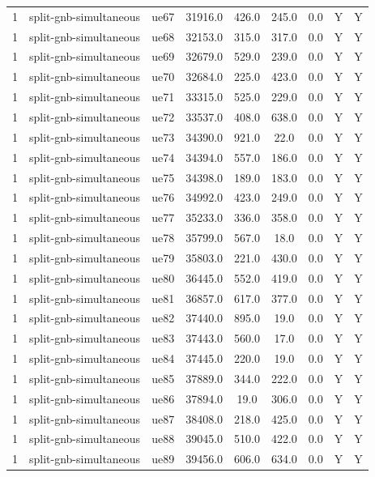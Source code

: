 \begin{table}[ht]
\begin{tabular}{|c|c|c|c|c|c|c|c|c|}
1 & split-gnb-simultaneous & ue67 & 31916.0 & 426.0 & 245.0 & 0.0 & Y & Y \\
1 & split-gnb-simultaneous & ue68 & 32153.0 & 315.0 & 317.0 & 0.0 & Y & Y \\
1 & split-gnb-simultaneous & ue69 & 32679.0 & 529.0 & 239.0 & 0.0 & Y & Y \\
1 & split-gnb-simultaneous & ue70 & 32684.0 & 225.0 & 423.0 & 0.0 & Y & Y \\
1 & split-gnb-simultaneous & ue71 & 33315.0 & 525.0 & 229.0 & 0.0 & Y & Y \\
1 & split-gnb-simultaneous & ue72 & 33537.0 & 408.0 & 638.0 & 0.0 & Y & Y \\
1 & split-gnb-simultaneous & ue73 & 34390.0 & 921.0 & 22.0 & 0.0 & Y & Y \\
1 & split-gnb-simultaneous & ue74 & 34394.0 & 557.0 & 186.0 & 0.0 & Y & Y \\
1 & split-gnb-simultaneous & ue75 & 34398.0 & 189.0 & 183.0 & 0.0 & Y & Y \\
1 & split-gnb-simultaneous & ue76 & 34992.0 & 423.0 & 249.0 & 0.0 & Y & Y \\
1 & split-gnb-simultaneous & ue77 & 35233.0 & 336.0 & 358.0 & 0.0 & Y & Y \\
1 & split-gnb-simultaneous & ue78 & 35799.0 & 567.0 & 18.0 & 0.0 & Y & Y \\
1 & split-gnb-simultaneous & ue79 & 35803.0 & 221.0 & 430.0 & 0.0 & Y & Y \\
1 & split-gnb-simultaneous & ue80 & 36445.0 & 552.0 & 419.0 & 0.0 & Y & Y \\
1 & split-gnb-simultaneous & ue81 & 36857.0 & 617.0 & 377.0 & 0.0 & Y & Y \\
1 & split-gnb-simultaneous & ue82 & 37440.0 & 895.0 & 19.0 & 0.0 & Y & Y \\
1 & split-gnb-simultaneous & ue83 & 37443.0 & 560.0 & 17.0 & 0.0 & Y & Y \\
1 & split-gnb-simultaneous & ue84 & 37445.0 & 220.0 & 19.0 & 0.0 & Y & Y \\
1 & split-gnb-simultaneous & ue85 & 37889.0 & 344.0 & 222.0 & 0.0 & Y & Y \\
1 & split-gnb-simultaneous & ue86 & 37894.0 & 19.0 & 306.0 & 0.0 & Y & Y \\
1 & split-gnb-simultaneous & ue87 & 38408.0 & 218.0 & 425.0 & 0.0 & Y & Y \\
1 & split-gnb-simultaneous & ue88 & 39045.0 & 510.0 & 422.0 & 0.0 & Y & Y \\
1 & split-gnb-simultaneous & ue89 & 39456.0 & 606.0 & 634.0 & 0.0 & Y & Y \\

\end{tabular}
\end{table}
